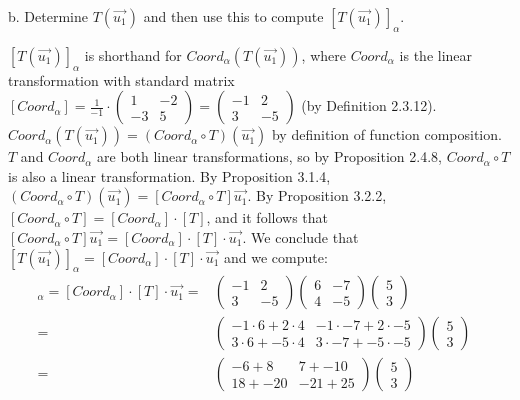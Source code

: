 \documentclass[12pt]{article}
\newenvironment{problem}[2][Problem]
{
	\begin{trivlist} 
		\item[\hskip \labelsep {\bfseries #1 #2:}]
	}
{
	\end{trivlist}
	}
\newenvironment{solution}[1][Solution]
{
	\begin{trivlist} 
		\item[\hskip \labelsep {\itshape #1:}]
	}
	{
	\end{trivlist}
}
\begin{document}
\begin{problem}{1}
\noindent
\newline
\newline
b. Determine $T(\vec{u_{1}})$ and then use this to compute $[T(\vec{u_{1}})]_{\alpha}$.
\begin{solution}
$[T(\vec{u_{1}})]_{\alpha}$ is shorthand for $Coord_{\alpha}(T(\vec{u_{1}}))$, where $Coord_{\alpha}$ is the linear transformation with standard matrix $[Coord_{\alpha}]=\frac{1}{-1}\cdot \begin{pmatrix} 1 & -2\\-3 & 5 \end{pmatrix} = \begin{pmatrix} -1 & 2\\3 & -5 \end{pmatrix}$ (by Definition 2.3.12). $Coord_{\alpha}(T(\vec{u_{1}})) = (Coord_{\alpha} \circ T)(\vec{u_{1}})$ by definition of function composition. $T$ and $Coord_{\alpha}$ are both linear transformations, so by Proposition 2.4.8, $Coord_{\alpha} \circ T$ is also a linear transformation. By Proposition 3.1.4, $(Coord_{\alpha} \circ T)(\vec{u_{1}}) = [Coord_{\alpha} \circ T]\vec{u_{1}}$. 
By Proposition 3.2.2,  $[Coord_{\alpha} \circ T] =  [Coord_{\alpha}]\cdot [T]$, and it follows that $ [Coord_{\alpha} \circ T]\vec{u_{1}}= [Coord_{\alpha}]\cdot [T] \cdot \vec{u_{1}}$. We conclude that $[T(\vec{u_{1}})]_{\alpha} = [Coord_{\alpha}]\cdot [T] \cdot \vec{u_{1}}$ and we compute:
\begin{align*}
 [T(\vec{u_{1}})]_{\alpha} = [Coord_{\alpha}]\cdot [T] \cdot \vec{u_{1}}=& \begin{pmatrix} -1 & 2\\3 & -5 \end{pmatrix} \begin{pmatrix}6&-7\\4&-5\end{pmatrix}\begin{pmatrix}5\\3\end{pmatrix} &\\
=& \begin{pmatrix} -1\cdot 6 + 2\cdot 4 & -1 \cdot -7 + 2 \cdot -5\\3 \cdot 6 + -5 \cdot 4 & 3\cdot -7 + -5 \cdot -5 \end{pmatrix} \begin{pmatrix}5\\3\end{pmatrix}&\\
=& \begin{pmatrix} -6 + 8 & 7 + -10 \\18+ -20 & -21 + 25 \end{pmatrix} \begin{pmatrix}5\\3\end{pmatrix}&\\

\end{align*}
\end{solution}
\end{problem}
\end{document}
